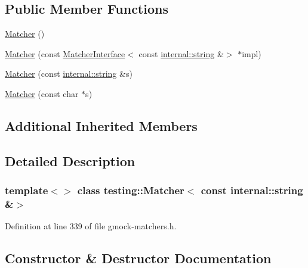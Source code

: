 \subsection*{Public Member Functions}
\begin{DoxyCompactItemize}
\item 
\hyperlink{classtesting_1_1Matcher_3_01const_01internal_1_1string_01_6_4_a4a2a2e3e0ef1007d8432e9e0ea8df979}{Matcher} ()
\item 
\hyperlink{classtesting_1_1Matcher_3_01const_01internal_1_1string_01_6_4_aa35956335ee37d048c49945b904c1fb9}{Matcher} (const \hyperlink{classtesting_1_1MatcherInterface}{Matcher\+Interface}$<$ const \hyperlink{namespacetesting_1_1internal_a8e8ff5b11e64078831112677156cb111}{internal\+::string} \&$>$ $\ast$impl)
\item 
\hyperlink{classtesting_1_1Matcher_3_01const_01internal_1_1string_01_6_4_a5014c9227335b575a1c0167b9c609bf8}{Matcher} (const \hyperlink{namespacetesting_1_1internal_a8e8ff5b11e64078831112677156cb111}{internal\+::string} \&s)
\item 
\hyperlink{classtesting_1_1Matcher_3_01const_01internal_1_1string_01_6_4_accc8b69db530a019efa2a1d6436eb3db}{Matcher} (const char $\ast$s)
\end{DoxyCompactItemize}
\subsection*{Additional Inherited Members}


\subsection{Detailed Description}
\subsubsection*{template$<$$>$\newline
class testing\+::\+Matcher$<$ const internal\+::string \&$>$}



Definition at line 339 of file gmock-\/matchers.\+h.



\subsection{Constructor \& Destructor Documentation}
\mbox{\label{classtesting_1_1Matcher_3_01const_01internal_1_1string_01_6_4_a4a2a2e3e0ef1007d8432e9e0ea8df979}} 
